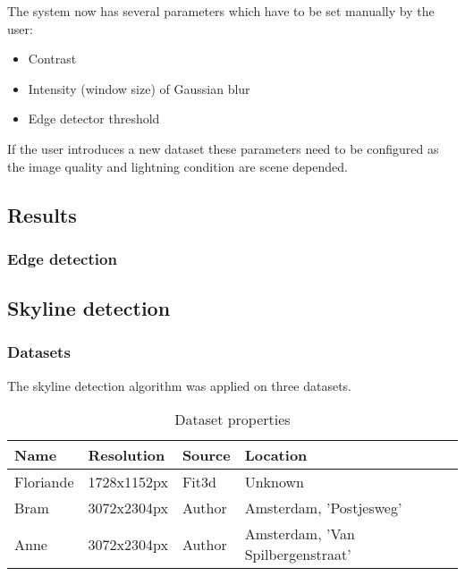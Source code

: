 The system now has several parameters which have to be set manually by the user:
\begin{itemize}
	\item Contrast
	\item Intensity (window size) of Gaussian blur
	\item Edge detector threshold
\end{itemize}

If the user introduces a new dataset these parameters need to be configured
as the image quality and lightning condition are scene depended.


\subsection{Results}
\subsubsection{Edge detection}
\label{sec:ResultEdge}
\clearpage
{}
\clearpage


\subsection{Skyline detection}
\subsubsection{Datasets}
The skyline detection algorithm was applied on three datasets. 

\begin{table}[ht]
\caption{Dataset properties}
\begin{tabular}{|l||l|l|l|}
\hline
Name 	& Resolution 	& Source	& Location\\
\hline
\hline
Floriande & 1728x1152px  & Fit3d \cite{Fit3d}  	& Unknown\\
\hline
Bram	 & 3072x2304px  & Author					& Amsterdam, 'Postjesweg'\\
\hline
Anne	& 3072x2304px  & Author					& Amsterdam, 'Van Spilbergenstraat'\\
\hline
\end{tabular}
\end{table}

